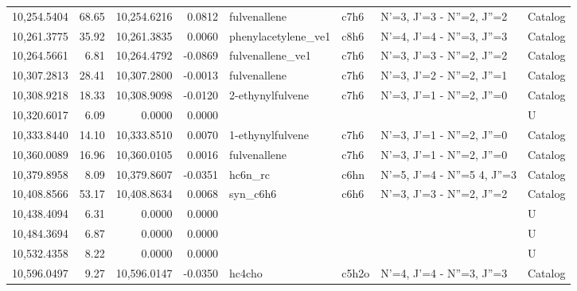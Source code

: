 \begin{longtable}{rrrrllll}
10,254.5404 &     68.65 &       10,254.6216 &    0.0812 &                fulvenallene &    c7h6 &            N'=3, J'=3 - N''=2, J''=2 &    Catalog \\
10,261.3775 &     35.92 &       10,261.3835 &    0.0060 &         phenylacetylene_ve1 &    c8h6 &            N'=4, J'=4 - N''=3, J''=3 &    Catalog \\
10,264.5661 &      6.81 &       10,264.4792 &   -0.0869 &            fulvenallene_ve1 &    c7h6 &            N'=3, J'=3 - N''=2, J''=2 &    Catalog \\
10,307.2813 &     28.41 &       10,307.2800 &   -0.0013 &                fulvenallene &    c7h6 &            N'=3, J'=2 - N''=2, J''=1 &    Catalog \\
10,308.9218 &     18.33 &       10,308.9098 &   -0.0120 &            2-ethynylfulvene &    c7h6 &            N'=3, J'=1 - N''=2, J''=0 &    Catalog \\
10,320.6017 &      6.09 &            0.0000 &    0.0000 &                             &         &                                      &          U \\
10,333.8440 &     14.10 &       10,333.8510 &    0.0070 &            1-ethynylfulvene &    c7h6 &            N'=3, J'=1 - N''=2, J''=0 &    Catalog \\
10,360.0089 &     16.96 &       10,360.0105 &    0.0016 &                fulvenallene &    c7h6 &            N'=3, J'=1 - N''=2, J''=0 &    Catalog \\
10,379.8958 &      8.09 &       10,379.8607 &   -0.0351 &                     hc6n_rc &    c6hn &      N'=5, J'=4 - N''=5     4, J''=3 &    Catalog \\
10,408.8566 &     53.17 &       10,408.8634 &    0.0068 &                    syn_c6h6 &    c6h6 &            N'=3, J'=3 - N''=2, J''=2 &    Catalog \\
10,438.4094 &      6.31 &            0.0000 &    0.0000 &                             &         &                                      &          U \\
10,484.3694 &      6.87 &            0.0000 &    0.0000 &                             &         &                                      &          U \\
10,532.4358 &      8.22 &            0.0000 &    0.0000 &                             &         &                                      &          U \\
10,596.0497 &      9.27 &       10,596.0147 &   -0.0350 &                      hc4cho &   c5h2o &            N'=4, J'=4 - N''=3, J''=3 &    Catalog \\

\end{longtable}
